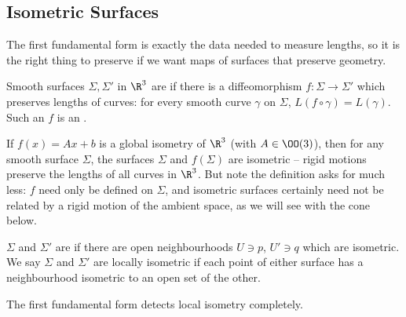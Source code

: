 \subsection{Isometric Surfaces}

The first fundamental form is exactly the data needed to measure lengths, so it is the right thing to preserve if we want maps of surfaces that preserve geometry.

\begin{definition}
    Smooth surfaces $\Sigma, \Sigma'$ in $\R^3$ are  if there is a diffeomorphism $f: \Sigma \rightarrow \Sigma'$ which preserves lengths of curves: for every smooth curve $\gamma$ on $\Sigma$, $L(f \circ \gamma) = L(\gamma)$. Such an $f$ is an .
\end{definition}

\begin{example}
    If $f(x) = Ax + b$ is a global isometry of $\R^3$ (with $A \in \OO(3)$), then for any smooth surface $\Sigma$, the surfaces $\Sigma$ and $f(\Sigma)$ are isometric -- rigid motions preserve the lengths of all curves in $\R^3$. But note the definition asks for much less: $f$ need only be defined on $\Sigma$, and isometric surfaces certainly need not be related by a rigid motion of the ambient space, as we will see with the cone below.
\end{example}

\begin{definition}
    $\Sigma$ and $\Sigma'$ are  if there are open neighbourhoods $U \ni p$, $U' \ni q$ which are isometric. We say $\Sigma$ and $\Sigma'$ are locally isometric if each point of either surface has a neighbourhood isometric to an open set of the other.
\end{definition}

The first fundamental form detects local isometry completely.

